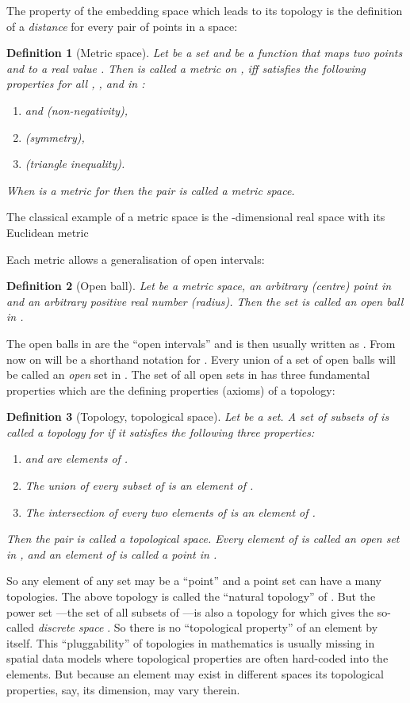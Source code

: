 \documentclass[5p]{elsarticle}
\newtheorem{dfn}{Definition}
\newcommand{\qq}[1]{``#1''}
\begin{document}
The property of the embedding space which leads to its topology is the 
definition of a \emph{distance} for every pair of points in a space:
\begin{dfn}[Metric space]
Let  be a set and  be a function that maps 
two points  and  to a real value . Then  is called a 
\emph{metric} on , iff  satisfies the following properties for all 
, , and  in :
\begin{enumerate}
\item  and  (non-negativity),
\item  (symmetry),
\item  (triangle inequality).
\end{enumerate}
When  is a metric for  then the pair  is called a \emph{metric space}.
\end{dfn}
The classical example of a metric space is the 
-di\-men\-sio\-nal real space  with its Euclidean metric 

Each metric allows a generalisation of open intervals: 
\begin{dfn}[Open ball]
Let  be a metric space,  an arbitrary (centre) point in  and 
 an arbitrary positive real number  (radius).  
Then the set  is called an \emph{open ball} 
in .
\end{dfn}
The open balls in  are the \qq{open intervals} and 
 is then usually written as . 
From now on  will be a shorthand notation for . 
Every union  of a set  of open balls will be called an 
\emph{open} set in . 
The set  of all open sets in  has three fundamental 
properties which are the defining properties (axioms) of a topology:
\begin{dfn}[Topology, topological space]
Let  be a set. A set  of subsets of  is called a \emph{topology} 
for  if it satisfies the following three properties:
\begin{enumerate}
\item  and  are elements of .
\item The union  of every subset  of  is an 
      element of .
\item The intersection  of every two elements  of  is an 
      element of .
\end{enumerate}
Then the pair  is called a \emph{topological space}.
Every element of  is called an \emph{open set} in , and 
an element of  is called a \emph{point} in .
\end{dfn}
So any element of any set may be a \qq{point} and a point set can have a many topologies. 
The above topology  is called the \qq{natural topology} 
of . 
But the power set ---the set of all subsets of 
---is also a topology for  which gives the so-called 
\emph{discrete space} . 
So there is no \qq{topological property} of an element by itself. 
This \qq{pluggability} of topologies in mathematics is usually missing in spatial data models 
where topological properties are often hard-coded into the elements. 
But because an element may exist in different spaces its topological properties, say, its 
dimension, may vary therein. 
\end{document}
